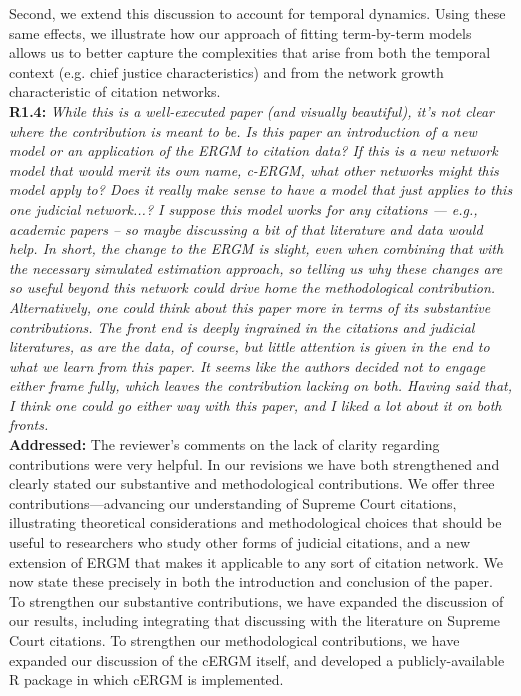 \documentclass[a4paper,11pt]{texMemo}
\begin{document}
Second, we extend this discussion to account for temporal dynamics. Using these same effects, we illustrate how our approach of fitting term-by-term models allows us to better capture the complexities that arise from both the temporal context (e.g. chief justice characteristics) and from the network growth characteristic of citation networks.\\


\noindent \textbf{R1.4:} \emph{ While this is a well-executed paper (and visually beautiful), it’s not clear where the contribution is meant to be. Is this paper an introduction of a new model or an application of the ERGM to citation data?  If this is a new network model that would merit its own name, c-ERGM, what other networks might this model apply to?  Does it really make sense to have a model that just applies to this one judicial network...? I suppose this model works for any citations --- e.g., academic papers -- so maybe discussing a bit of that literature and data would help. In short, the change to the ERGM is slight, even when combining that with the necessary simulated estimation approach, so telling us why these changes are so useful beyond this network could drive home the methodological contribution.  Alternatively, one could think about this paper more in terms of its substantive contributions. The front end is deeply ingrained in the citations and judicial literatures, as are the data, of course, but little attention is given in the end to what we learn from this paper. It seems like the authors decided not to engage either frame fully, which leaves the contribution lacking on both. Having said that, I think one could go either way with this paper, and I liked a lot about it on both fronts. }\\

\noindent \textbf{Addressed:}  The reviewer's comments on the lack of clarity regarding contributions were very helpful. In our revisions we have both strengthened and clearly stated our substantive and methodological contributions. We offer three contributions---advancing our understanding of Supreme Court citations, illustrating theoretical considerations and methodological choices that should be useful to researchers who study other forms of judicial citations, and a new extension of ERGM that makes it applicable to any sort of citation network. We now state these precisely in both the introduction and conclusion of the paper. To strengthen our substantive contributions, we have expanded the discussion of our results, including integrating that discussing with the literature on Supreme Court citations. To strengthen our methodological contributions, we have expanded our discussion of the cERGM itself, and developed a publicly-available R package in which cERGM is implemented.
\end{document}
